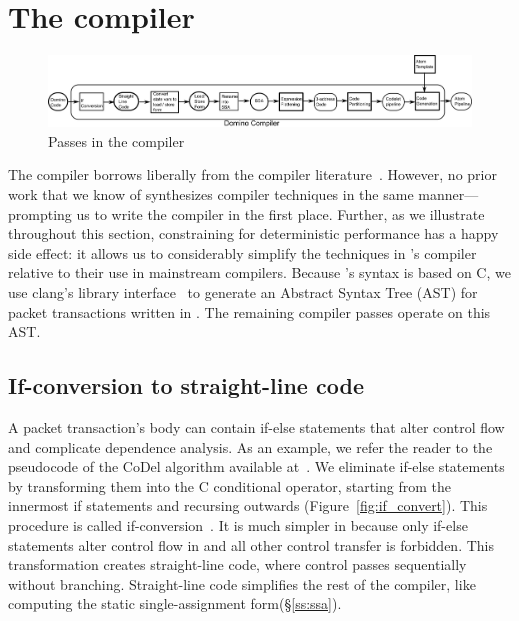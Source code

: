 \section{The \pktlanguage compiler}
\label{s:compiler}

\begin{figure}[!t]
  \includegraphics[width=\textwidth]{compiler.pdf}
  \caption{Passes in the \pktlanguage compiler}
\end{figure}

The \pktlanguage compiler borrows liberally from the compiler
literature~\cite{muchnik}. However, no prior work that we know of synthesizes
compiler techniques in the same manner---prompting us to write the \pktlanguage
compiler in the first place. Further, as we illustrate throughout this section,
constraining \pktlanguage for deterministic performance has a happy side
effect: it allows us to considerably simplify the techniques in \pktlanguage's
compiler relative to their use in mainstream compilers. Because \pktlanguage's
syntax is based on C, we use clang's library interface~\cite{libclang} to
generate an Abstract Syntax Tree (AST) for packet transactions written in
\pktlanguage. The remaining compiler passes operate on this AST.

\subsection{If-conversion to straight-line code}
A packet transaction's body can contain if-else statements that alter control
flow and complicate dependence analysis. As an example, we refer the reader to
the pseudocode of the CoDel algorithm available at~\cite{codel_code}. We
eliminate if-else statements by transforming them into the C conditional
operator, starting from the innermost if statements and recursing outwards
(Figure~\ref{fig:if_convert}). This procedure is called
if-conversion~\cite{if_conversion}. It is much simpler in \pktlanguage because
only if-else statements alter control flow in \pktlanguage and all other control
transfer is forbidden.  This transformation creates
straight-line code, where control passes sequentially without branching.
Straight-line code simplifies the rest of the compiler, like computing the
static single-assignment form(\S\ref{ss:ssa}).

